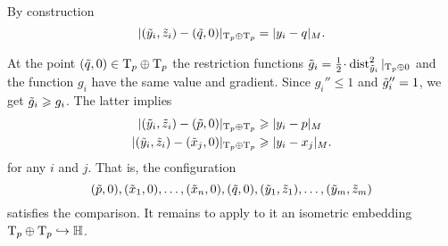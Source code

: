 By construction
\[|(\~y_i,\~z_i)-(\~q,0)|_{\T_p\oplus\T_p}=|y_i-q|_M.\]

At the point $(\~q,0)\in \T_p\oplus\T_p$ the restriction functions $\~g_i=\tfrac12\cdot\dist^2_{\~y_i}|_{\T_p\oplus 0}$ and the function $g_i$ have the same value and gradient.
Since $g_i''\le 1$ and $\~g_i''=1$, we get $\~g_i\ge g_i$. 
The latter implies
\begin{align*}
|(\~y_i,\~z_i)-(\~p,0)|_{\T_p\oplus\T_p}&\ge|y_i-p|_M
\\
|(\~y_i,\~z_i)-(\~x_j,0)|_{\T_p\oplus\T_p}&\ge|y_i-x_j|_M.
\end{align*}
for any $i$ and $j$.
That is, the configuration 
\[(\~p,0), (\~x_1,0),\dots,(\~x_n,0), (\~q,0), (\~y_1,\~z_1),\dots,(\~y_m,\~z_m)\]
satisfies the comparison.
It remains to apply to it an isometric embedding $\T_p\oplus\T_p\hookrightarrow \HH$.
\qeds


